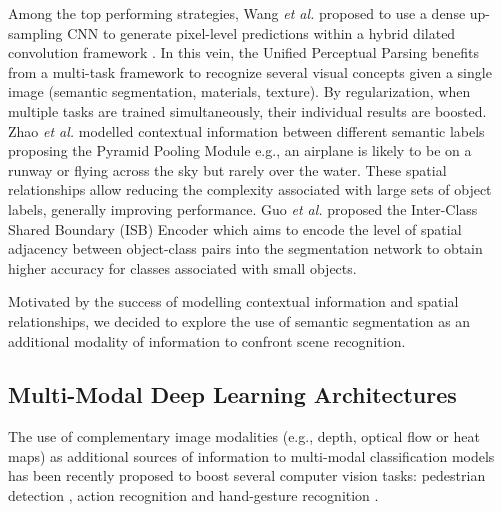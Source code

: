 \documentclass[review, 3p, sort&compress]{elsarticle}
\begin{document}
Among the top performing strategies, Wang \textit{et al.} proposed to use a dense up-sampling CNN to generate pixel-level predictions within a hybrid dilated convolution framework \cite{wang2017understanding}. In this vein, the Unified Perceptual Parsing \cite{xiao2018unified} benefits from a multi-task framework to recognize several visual concepts given a single image (semantic segmentation, materials, texture). By regularization, when multiple tasks are trained simultaneously, their individual results are boosted. Zhao \textit{et al.} modelled contextual information between different semantic labels proposing the Pyramid Pooling Module \cite{zhao2016pyramid}\textemdash e.g., an airplane is likely to be on a runway or flying across the sky but rarely over the water. These spatial relationships allow reducing the complexity associated with large sets of object labels, generally improving performance. Guo \textit{et al.} \cite{guo2018small} proposed the Inter-Class Shared Boundary (ISB) Encoder which aims to encode the level of spatial adjacency between object-class pairs into the segmentation network to obtain higher accuracy for classes associated with small objects. 

Motivated by the success of modelling contextual information and spatial relationships, we decided to explore the use of semantic segmentation as an additional modality of information to confront scene recognition.

\subsection{Multi-Modal Deep Learning Architectures}
The use of complementary image modalities (e.g., depth, optical flow or heat maps) as additional sources of information to multi-modal classification models has been recently proposed to boost several computer vision tasks: pedestrian detection \cite{park2013exploring, yang2015convolutional, daniel2016semantic, mao2017can}, action recognition \cite{simonyan2014two, park2016combining} and hand-gesture recognition \cite{abavisani2018improving}.
\end{document}
